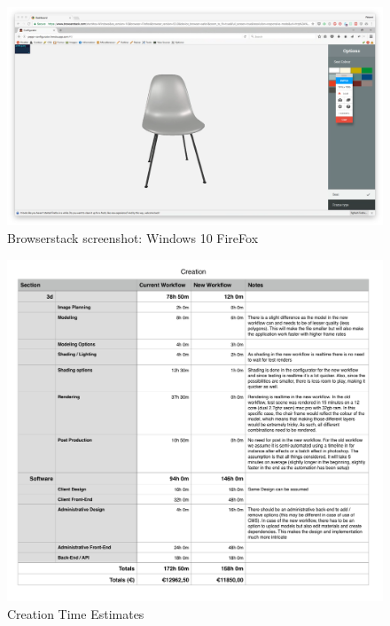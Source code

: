 \begin{figure}
\includegraphics[width=15cm]{images/deviceScreenshots/Windows10Firefox}
\caption{Browserstack screenshot: Windows 10 FireFox}
\label{attachment:Windows10Firefox}
\end{figure}

\clearpage

\begin{figure}
\includegraphics[width=15cm]{images/creationtime}
\caption{Creation Time Estimates}
\label{attachment:creationTime}
\end{figure}

